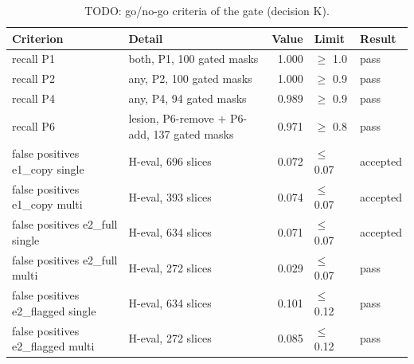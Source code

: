 \begin{table}
\centering
\footnotesize
\begin{tabular}{llrll}
\toprule
Criterion & Detail & Value & Limit & Result \\
\midrule
recall P1 & both, P1, 100 gated masks & 1.000 & $\geq$ 1.0 & pass \\
recall P2 & any, P2, 100 gated masks & 1.000 & $\geq$ 0.9 & pass \\
recall P4 & any, P4, 94 gated masks & 0.989 & $\geq$ 0.9 & pass \\
recall P6 & lesion, P6-remove + P6-add, 137 gated masks & 0.971 & $\geq$ 0.8 & pass \\
false positives e1\_copy single & H-eval, 696 slices & 0.072 & $\leq$ 0.07 & accepted \\
false positives e1\_copy multi & H-eval, 393 slices & 0.074 & $\leq$ 0.07 & accepted \\
false positives e2\_full single & H-eval, 634 slices & 0.071 & $\leq$ 0.07 & accepted \\
false positives e2\_full multi & H-eval, 272 slices & 0.029 & $\leq$ 0.07 & pass \\
false positives e2\_flagged single & H-eval, 634 slices & 0.101 & $\leq$ 0.12 & pass \\
false positives e2\_flagged multi & H-eval, 272 slices & 0.085 & $\leq$ 0.12 & pass \\
\bottomrule
\end{tabular}
\caption{TODO: go/no-go criteria of the gate (decision K).}
\label{tab:gate}
\end{table}
